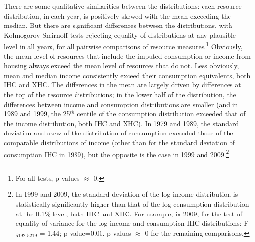 There are some qualitative similarities between the distributions: each resource distribution, in each year, is positively skewed with the mean exceeding the median. But there are significant differences between the distributions, with Kolmogorov-Smirnoff tests rejecting equality of distributions at any plausible level in all years, for all pairwise comparisons of resource measures.\footnote{For all tests, p-values $\approx$ 0.} Obviously, the mean level of resources that include the imputed consumption or income from housing always exceed the mean level of resources that do not. Less obviously, mean and median income consistently exceed their consumption equivalents, both IHC and XHC. The differences in the mean are largely driven by differences at the top of the resource distributions; in the lower half of the distribution, the differences between income and consumption distributions are smaller (and in 1989 and 1999, the 25$^{th}$ centile of the consumption distribution exceeded that of the income distribution, both IHC and XHC). In 1979 and 1989, the standard deviation and skew of the distribution of consumption exceeded those of the comparable distributions of income (other than for the standard deviation of consumption IHC in 1989), but the opposite is the case in 1999 and 2009.\footnote{In 1999 and 2009, the standard deviation of the log income distribution is statistically significantly higher than that of the log consumption distribution at the 0.1\% level, both IHC and XHC. For example, in 2009, for the test of equality of variance for the log income and consumption IHC distributions: F$_{5192,5219}$ = 1.44; p-value=0.00. p-values $\approx$ 0 for the remaining comparisons.} 

